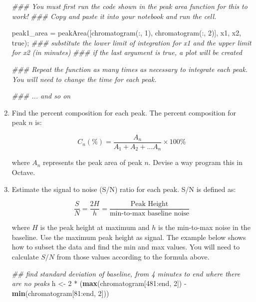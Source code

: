 \documentclass[]{tufte-book}
\newenvironment{Shaded}{}{}
\newcommand{\CommentTok}[1]{\textcolor[rgb]{0.38,0.63,0.69}{\textit{#1}}}
\newcommand{\DecValTok}[1]{\textcolor[rgb]{0.25,0.63,0.44}{#1}}
\newcommand{\FloatTok}[1]{\textcolor[rgb]{0.25,0.63,0.44}{#1}}
\newcommand{\FunctionTok}[1]{\textcolor[rgb]{0.02,0.16,0.49}{#1}}
\newcommand{\KeywordTok}[1]{\textcolor[rgb]{0.00,0.44,0.13}{\textbf{#1}}}
\newcommand{\NormalTok}[1]{#1}
\newcommand{\OperatorTok}[1]{\textcolor[rgb]{0.40,0.40,0.40}{#1}}
\newcommand{\StringTok}[1]{\textcolor[rgb]{0.25,0.44,0.63}{#1}}
\begin{document}
\begin{enumerate}
\begin{Shaded}
\begin{Highlighting}[]
\CommentTok{### You must first run the code shown in the peak area function for this to work!}
\CommentTok{### Copy and paste it into your notebook and run the cell.}

\NormalTok{peak1_area }\OperatorTok{=}\NormalTok{ peakArea([chromatogram(}\OperatorTok{:,} \FloatTok{1}\NormalTok{)}\OperatorTok{,}\NormalTok{ chromatogram(}\OperatorTok{:,} \FloatTok{2}\NormalTok{)]}\OperatorTok{,}\NormalTok{ x1}\OperatorTok{,}\NormalTok{ x2}\OperatorTok{,} \FunctionTok{true}\NormalTok{)}\OperatorTok{;}
\CommentTok{### substitute the lower limit of integration for x1 and the upper limit for x2 (in minutes)}
\CommentTok{### if the last argument is true, a plot will be created}

\CommentTok{### Repeat the function as many times as necessary to integrate each peak.  You will need to change the time for each peak.}

\CommentTok{### ... and so on}
\end{Highlighting}
\end{Shaded}
\item
  Find the percent composition for each peak. The percent composition for peak \(n\) is:

  \[
   C_n(\%)=\frac{A_n}{A_1 + A_2 + ... A_n} \times 100\%
   \]

  where \(A_n\) represents the peak area of peak \(n\). Devise a way program this in Octave.
\item
  Estimate the signal to noise (S/N) ratio for each peak. S/N is defined as:

  \[
   \frac{S}{N} = \frac{2H}{h} = \frac{\text{Peak Height}}{\text{min-to-max baseline noise}}
   \]

  where \(H\) is the peak height at maximum and \(h\) is the min-to-max noise in the baseline. Use the maximum peak height as signal. The example below shows how to subset the data and find the min and max values. You will need to calculate \(S/N\) from those values according to the formula above.

\begin{Shaded}
\begin{Highlighting}[]
\CommentTok{## find standard deviation of baseline, from 4 minutes to end where there are no peaks}
\NormalTok{h <-}\StringTok{ }\DecValTok{2} \OperatorTok{*}\StringTok{ }\NormalTok{(}\KeywordTok{max}\NormalTok{(chromatogram[}\DecValTok{481}\OperatorTok{:}\NormalTok{end, }\DecValTok{2}\NormalTok{]) }\OperatorTok{-}\StringTok{ }\KeywordTok{min}\NormalTok{(chromatogram[}\DecValTok{81}\OperatorTok{:}\NormalTok{end, }\DecValTok{2}\NormalTok{]))}


\end{Highlighting}
\end{Shaded}
\end{enumerate}
\end{document}
